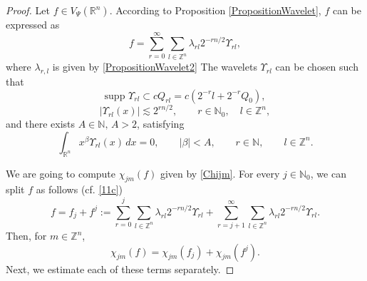 \documentclass[11pt, a4paper,leqno]{amsart}
\theoremstyle{plain}
\numberwithin{equation}{section}
\theoremstyle{definition}
\theoremstyle{remark}
\begin{document}
\begin{proof}
Let $f \in V_{\Psi}(\mathbb{R}^{n})$. According to Proposition
\ref{PropositionWavelet}, $f$ can be expressed as
\begin{equation}
\label{11c}f = \sum_{r=0}^{\infty}\sum_{l \in\mathbb{Z}^{n}} \lambda_{r l}
2^{-r n/2} \Upsilon_{r l},
\end{equation}
where $\lambda_{r, l}$ is given by \eqref{PropositionWavelet2} The wavelets
$\Upsilon_{r l}$ can be chosen such that
\begin{equation}
\label{11b}\text{supp } \Upsilon_{r l} \subset c Q_{r l} = c (2^{-r} l + 2^{-r} Q_0),
\end{equation}
\begin{equation}
\label{11a}|\Upsilon_{r l}(x)| \lesssim2^{r n/2}, \qquad r \in\mathbb{N}_{0},
\quad l \in\mathbb{Z}^{n},
\end{equation}
and there exists $A \in\mathbb{N}, \, A > 2$, satisfying
\begin{equation}
\label{11}\int_{\mathbb{R}^{n}} x^{\beta}\Upsilon_{r l}(x) \, dx = 0,
\qquad|\beta| < A, \qquad r \in\mathbb{N}, \qquad l \in\mathbb{Z}^{n}.
\end{equation}
%
%


We are going to compute $\chi_{j m}(f)$ given by \eqref{Chijm}. For every $j\in\mathbb{N}_{0}$, we can split $f$ as follows (cf. \eqref{11c})
\begin{equation}
f=f_{j}+f^{j}:=\sum_{r=0}^{j}\sum_{l\in\mathbb{Z}^{n}}\lambda_{rl}%
2^{-rn/2}\Upsilon_{rl}+\sum_{r=j+1}^{\infty}\sum_{l\in\mathbb{Z}^{n}}%
\lambda_{rl}2^{-rn/2}\Upsilon_{rl}. \label{11d}%
\end{equation}
Then, for $m\in\mathbb{Z}^{n}$,
\begin{equation}
\chi_{jm}(f)=\chi_{jm}(f_{j})+\chi_{jm}(f^{j}). \label{6}%
\end{equation}
Next, we estimate each of these terms separately.


\end{proof}
\end{document}
